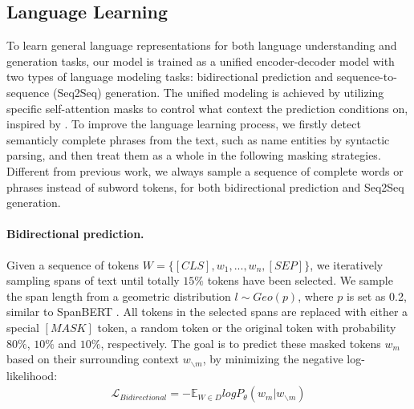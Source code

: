 \documentclass[11pt,a4paper]{article}
\begin{document}
\subsection{Language Learning}
\label{ssec:lan}

To learn general language representations for both language understanding and generation tasks, our model is trained as a unified encoder-decoder model with two types of language modeling tasks: bidirectional prediction and sequence-to-sequence (Seq2Seq) generation.
The unified modeling is achieved by utilizing specific self-attention masks to control what context the prediction conditions on, inspired by \citet{dong2019unified}.
To improve the language learning process, we firstly detect semanticly complete phrases from the text, such as name entities by syntactic parsing, and then treat them as a whole in the following masking strategies.
Different from previous work, we always sample a sequence of complete words or phrases instead of subword tokens, for both bidirectional prediction and Seq2Seq generation.

\paragraph{Bidirectional prediction.} 
Given a sequence of tokens $W=\{[CLS],w_1,...,w_n,[SEP]\}$, we iteratively sampling spans of text until totally $15\%$ tokens have been selected.
We sample the span length from a geometric distribution $l \sim Geo(p)$, where $p$ is set as 0.2, similar to SpanBERT \citep{joshi-etal-2020-spanbert}.
All tokens in the selected spans are replaced with either a special $[MASK]$ token, a random token or the original token with probability $80\%$, $10\%$ and $10\%$, respectively.
The goal is to predict these masked tokens $w_m$ based on their surrounding context $w_{\backslash m}$, by minimizing the negative log-likelihood:
\begin{equation}
\begin{aligned}
    \mathcal{L}_{Bidirectional} = - \mathbb{E}_{W \in D} log P_{\theta} (w_m|w_{\backslash m})
\end{aligned}
\label{eq2}
\end{equation}
\end{document}
